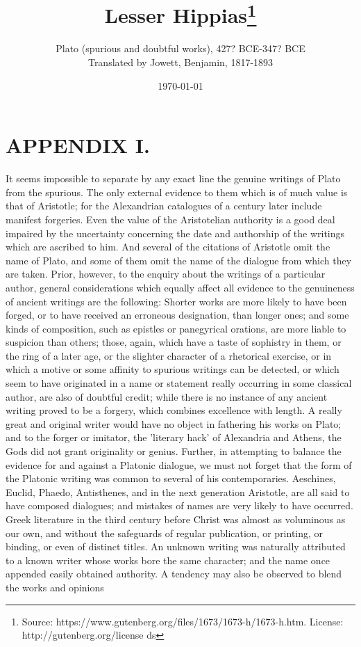 \documentclass[11pt,letter]{article}
\begin{document}
\title{Lesser Hippias\thanks{Source: https://www.gutenberg.org/files/1673/1673-h/1673-h.htm. License: http://gutenberg.org/license ds}}
\date{\today}
\author{Plato (spurious and doubtful works), 427? BCE-347? BCE\\ Translated by Jowett, Benjamin, 1817-1893}
\maketitle

\setcounter{tocdepth}{1}
\tableofcontents
\renewcommand{\baselinestretch}{1.0}
\normalsize
\newpage

\section{
      APPENDIX I.
    }
\par  It seems impossible to separate by any exact line the genuine writings of Plato from the spurious. The only external evidence to them which is of much value is that of Aristotle; for the Alexandrian catalogues of a century later include manifest forgeries. Even the value of the Aristotelian authority is a good deal impaired by the uncertainty concerning the date and authorship of the writings which are ascribed to him. And several of the citations of Aristotle omit the name of Plato, and some of them omit the name of the dialogue from which they are taken. Prior, however, to the enquiry about the writings of a particular author, general considerations which equally affect all evidence to the genuineness of ancient writings are the following: Shorter works are more likely to have been forged, or to have received an erroneous designation, than longer ones; and some kinds of composition, such as epistles or panegyrical orations, are more liable to suspicion than others; those, again, which have a taste of sophistry in them, or the ring of a later age, or the slighter character of a rhetorical exercise, or in which a motive or some affinity to spurious writings can be detected, or which seem to have originated in a name or statement really occurring in some classical author, are also of doubtful credit; while there is no instance of any ancient writing proved to be a forgery, which combines excellence with length. A really great and original writer would have no object in fathering his works on Plato; and to the forger or imitator, the 'literary hack' of Alexandria and Athens, the Gods did not grant originality or genius. Further, in attempting to balance the evidence for and against a Platonic dialogue, we must not forget that the form of the Platonic writing was common to several of his contemporaries. Aeschines, Euclid, Phaedo, Antisthenes, and in the next generation Aristotle, are all said to have composed dialogues; and mistakes of names are very likely to have occurred. Greek literature in the third century before Christ was almost as voluminous as our own, and without the safeguards of regular publication, or printing, or binding, or even of distinct titles. An unknown writing was naturally attributed to a known writer whose works bore the same character; and the name once appended easily obtained authority. A tendency may also be observed to blend the works and opinions 
\end{document}

